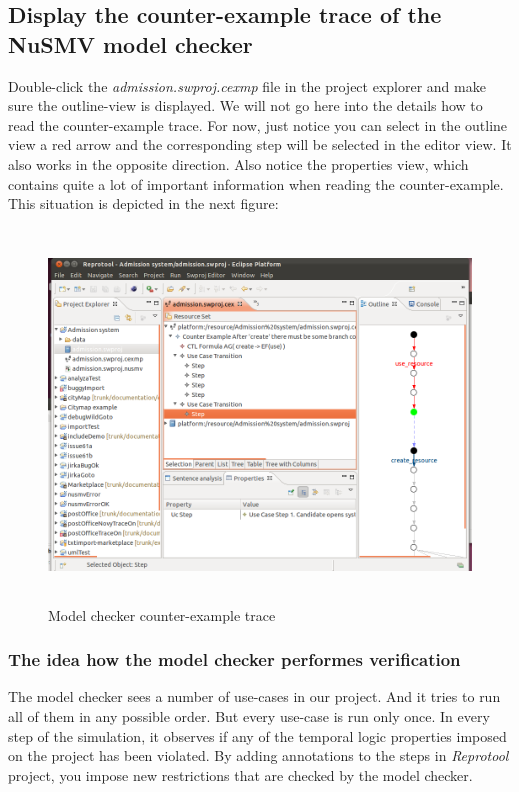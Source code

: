 \subsection{Display the counter-example trace of the NuSMV model checker}

Double-click the \emph{admission.swproj.cexmp} file in the project explorer and make sure the outline-view is displayed. We will not go
here into the details how to read the counter-example trace. For now, just notice you can select in the outline view a red arrow and the
corresponding step will be selected in the editor view. It also works in the opposite direction. Also notice the properties view, which
contains quite a lot of important information when reading the counter-example. This situation is depicted in the next figure:
\begin{figure}[ht]
  \centering
  \includegraphics[height=280pt]{images/reprotoolQuickTutorial3}
  \caption{Model checker counter-example trace}
  \label{fig:reprotoolQuickTutorial3}
\end{figure}

\subsubsection{The idea how the model checker performes verification}
The model checker sees a number of use-cases in our project. And it tries to run all of them in any possible order. But every use-case
is run only once. In every step of the simulation, it observes if any of the temporal logic properties imposed on the project has been
violated. By adding annotations to the steps in \emph{Reprotool} project, you impose new restrictions that are checked by the model
checker.

